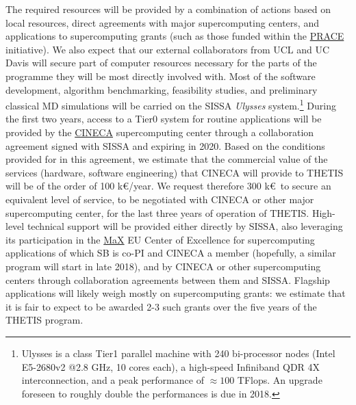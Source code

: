 The required resources will be provided by a combination of actions based on local resources, direct agreements with major supercomputing centers, and applications to supercomputing grants (such as those funded within the \href{http://www.prace-ri.eu}{PRACE} initiative). We also expect that our external collaborators from UCL and UC Davis will secure part of computer resources necessary for the parts of the programme they will be most directly involved with. Most of the software development, algorithm benchmarking, feasibility studies, and preliminary classical MD simulations will be carried on the SISSA \emph{Ulysses} system.\footnote{Ulysses is a class Tier1 parallel machine with 240 bi-processor nodes (Intel E5-2680v2 @2.8 GHz, 10 cores each), a high-speed Infiniband QDR 4X interconnection, and a peak performance of $\approx 100$ TFlops. An upgrade foreseen to roughly double the performances is due in 2018.} During the first two years, access to a Tier0 system for routine applications will be provided by the \href{http://www.cineca.it}{CINECA} supercomputing center through a collaboration agreement signed with SISSA and expiring in 2020. Based on the conditions provided for in this agreement, we estimate that the commercial value of the services (hardware, software engineering) that CINECA will provide to THETIS will be of the order of 100 k\euro/year. We request therefore 300 k\euro\ to secure an equivalent level of service, to be negotiated with CINECA or other major supercomputing center, for the last three years of operation of THETIS. High-level technical support will be provided either directly by SISSA, also leveraging its participation in the \href{http://www.max-centre.eu}{\sc MaX} EU Center of Excellence for supercomputing applications of which SB is co-PI and CINECA a member (hopefully, a similar program will start in late 2018), and by CINECA or other supercomputing centers through collaboration agreements between them and SISSA. Flagship applications will likely weigh mostly on supercomputing grants: we estimate that it is fair to expect to be awarded 2-3 such grants over the five years of the THETIS program. 

